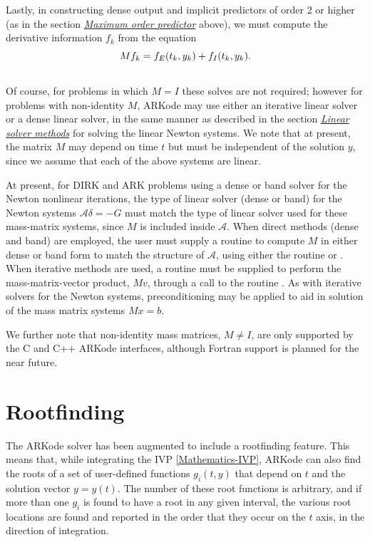 \documentclass[letterpaper,10pt,english]{sphinxmanual}
\begin{document}
Lastly, in constructing dense output and implicit predictors of order
2 or higher (as in the section {\hyperref[Mathematics:mathematics-predictors-max]{\emph{Maximum order predictor}}} above),
we must compute the derivative information $f_k$ from the equation
\begin{gather}
\begin{split}M f_k = f_E(t_k, y_k) + f_I(t_k, y_k).\end{split}\notag\\\begin{split}\end{split}\notag
\end{gather}
Of course, for problems in which $M=I$ these solves are not
required; however for problems with non-identity $M$, ARKode may
use either an iterative linear solver or a dense linear solver, in the
same manner as described in the section {\hyperref[Mathematics:mathematics-linear]{\emph{Linear solver methods}}} for solving
the linear Newton systems.  We note that at present, the matrix
$M$ may depend on time $t$ but must be independent of the
solution $y$, since we assume that each of the above systems are
linear.

At present, for DIRK and ARK problems using a dense or band solver for
the Newton nonlinear iterations, the type of linear solver (dense or
band) for the Newton systems ${\mathcal A}\delta = -G$ must
match the type of linear solver used for these mass-matrix systems,
since $M$ is included inside ${\mathcal A}$.  When direct
methods (dense and band) are employed, the user must supply a routine
to compute $M$ in either dense or band form to match the
structure of ${\mathcal A}$, using either the routine
{\hyperref[c_interface/User_supplied:ARKDlsDenseMassFn]{}} or {\hyperref[c_interface/User_supplied:ARKDlsBandMassFn]{}}.  When
iterative methods are used, a routine must be supplied to perform the
mass-matrix-vector product, $Mv$, through a call to the routine
{\hyperref[c_interface/User_supplied:ARKSpilsMassTimesVecFn]{}}.  As with iterative solvers for the
Newton systems, preconditioning may be applied to aid in solution of
the mass matrix systems $Mx=b$.

We further note that non-identity mass matrices, $M\ne I$, are
only supported by the C and C++ ARKode interfaces, although Fortran
support is planned for the near future.


\section{Rootfinding}
\label{Mathematics:mathematics-rootfinding}\label{Mathematics:rootfinding}
The ARKode solver has been augmented to include a rootfinding
feature. This means that, while integrating the IVP \eqref{Mathematics-IVP}, ARKode
can also find the roots of a set of user-defined functions
$g_i(t,y)$ that depend on $t$ and the solution vector
$y = y(t)$. The number of these root functions is arbitrary, and
if more than one $g_i$ is found to have a root in any given
interval, the various root locations are found and reported in the
order that they occur on the $t$ axis, in the direction of
integration.
\end{document}
